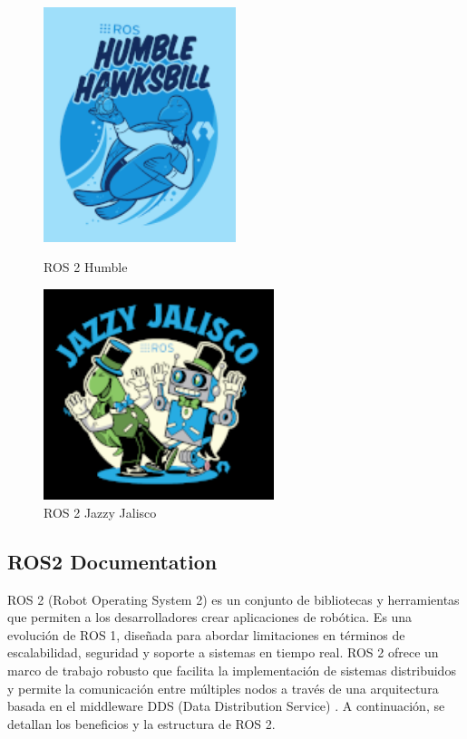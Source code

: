     \begin{figure}[h!]
        \centering
        \begin{minipage}{0.45\textwidth}
            \centering
            \includegraphics[width=0.5\textwidth]{pictures/humble_logo.png}
            \caption{ROS 2 Humble}
            \label{fig:imagen1}
        \end{minipage}
        \hfill
        \begin{minipage}{0.45\textwidth}
            \centering
            \includegraphics[width=0.6\textwidth]{pictures/jazzy_logo.png}
            \caption{ROS 2 Jazzy Jalisco}
            \label{fig:imagen2}
        \end{minipage}
    \end{figure}

\subsection{ROS2 Documentation}
    ROS 2 (Robot Operating System 2) es un conjunto de bibliotecas y herramientas que permiten a los desarrolladores crear aplicaciones de robótica. Es una evolución de ROS 1, diseñada para abordar limitaciones en términos de escalabilidad, seguridad y soporte a sistemas en tiempo real. ROS 2 ofrece un marco de trabajo robusto que facilita la implementación de sistemas distribuidos y permite la comunicación entre múltiples nodos a través de una arquitectura basada en el middleware DDS (Data Distribution Service) \cite{ros_docs}. A continuación, se detallan los beneficios y la estructura de ROS 2.

